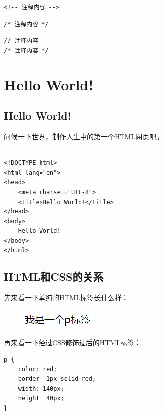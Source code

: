 \begin{lstlisting}[style=htmlcssjs, title=HTML注释]
<!-- 注释内容 -->
\end{lstlisting}

\begin{lstlisting}[style=htmlcssjs, title=CSS注释]
/* 注释内容 */
\end{lstlisting}

\begin{lstlisting}[style=htmlcssjs, title=JavaScript注释]
// 注释内容
/* 注释内容 */
\end{lstlisting}

\newpage

\section{Hello World!}

\subsection{Hello World!}

问候一下世界，制作人生中的第一个HTML网页吧。\\

\\

\begin{lstlisting}[style=htmlcssjs]
<!DOCTYPE html>
<html lang="en">
<head>
    <meta charset="UTF-8">
    <title>Hello World!</title>
</head>
<body>
    Hello World!
</body>
</html>
\end{lstlisting}

\vspace{0.5cm}

\subsection{HTML和CSS的关系}

先来看一下单纯的HTML标签长什么样：

\begin{figure}[H]
	\centering
	\includegraphics[]{img/C1/1-3/1.png}
\end{figure}

再来看一下经过CSS修饰过后的HTML标签：\\

\begin{lstlisting}[style=htmlcssjs]
p {
    color: red;
    border: 1px solid red;
    width: 140px;
    height: 40px;
}
\end{lstlisting}


